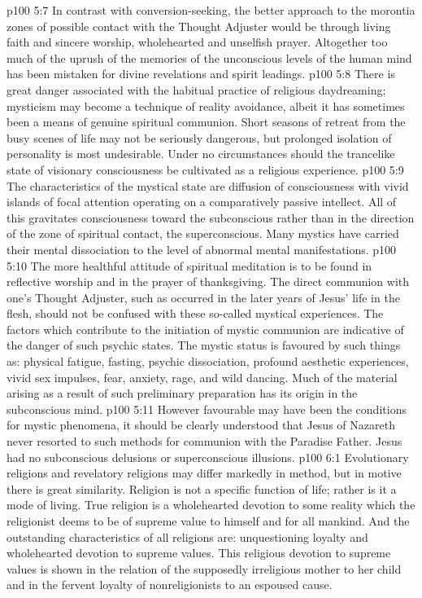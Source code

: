 \vs p100 5:7 \pc In contrast with conversion\hyp{}seeking, the better approach to the morontia zones of possible contact with the Thought Adjuster would be through living faith and sincere worship, wholehearted and unselfish prayer. Altogether too much of the uprush of the memories of the unconscious levels of the human mind has been mistaken for divine revelations and spirit leadings.
\vs p100 5:8 There is great danger associated with the habitual practice of religious daydreaming; mysticism may become a technique of reality avoidance, albeit it has sometimes been a means of genuine spiritual communion. Short seasons of retreat from the busy scenes of life may not be seriously dangerous, but prolonged isolation of personality is most undesirable. Under no circumstances should the trancelike state of visionary consciousness be cultivated as a religious experience.
\vs p100 5:9 The characteristics of the mystical state are diffusion of consciousness with vivid islands of focal attention operating on a comparatively passive intellect. All of this gravitates consciousness toward the subconscious rather than in the direction of the zone of spiritual contact, the superconscious. Many mystics have carried their mental dissociation to the level of abnormal mental manifestations.
\vs p100 5:10 The more healthful attitude of spiritual meditation is to be found in reflective worship and in the prayer of thanksgiving. The direct communion with one’s Thought Adjuster, such as occurred in the later years of Jesus’ life in the flesh, should not be confused with these so\hyp{}called mystical experiences. The factors which contribute to the initiation of mystic communion are indicative of the danger of such psychic states. The mystic status is favoured by such things as: physical fatigue, fasting, psychic dissociation, profound aesthetic experiences, vivid sex impulses, fear, anxiety, rage, and wild dancing. Much of the material arising as a result of such preliminary preparation has its origin in the subconscious mind.
\vs p100 5:11 However favourable may have been the conditions for mystic phenomena, it should be clearly understood that Jesus of Nazareth never resorted to such methods for communion with the Paradise Father. Jesus had no subconscious delusions or superconscious illusions.
\vs p100 6:1 Evolutionary religions and revelatory religions may differ markedly in method, but in motive there is great similarity. Religion is not a specific function of life; rather is it a mode of living. True religion is a wholehearted devotion to some reality which the religionist deems to be of supreme value to himself and for all mankind. And the outstanding characteristics of all religions are: unquestioning loyalty and wholehearted devotion to supreme values. This religious devotion to supreme values is shown in the relation of the supposedly irreligious mother to her child and in the fervent loyalty of nonreligionists to an espoused cause.
